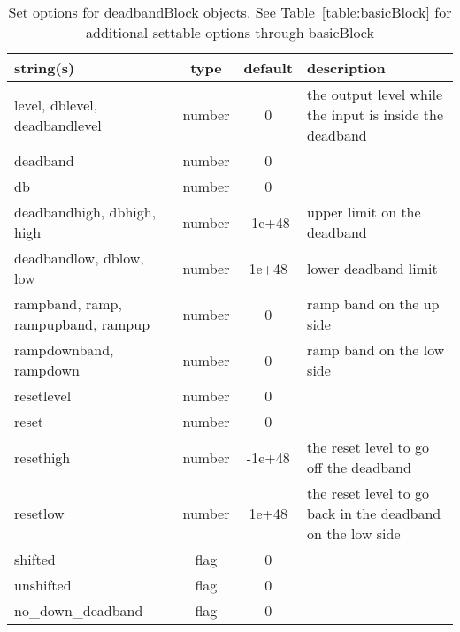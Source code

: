 \begin{table}[ht]
\centering
\begin{tabular}{p{5cm} c c p{7cm}}
\hline
string(s) & type & default & description \\
\hline
level, dblevel, deadbandlevel & number & 0 & the output level while the input is inside the deadband\\
deadband & number & 0 & \\
db & number & 0 & \\
deadbandhigh, dbhigh, high & number & -1e+48 & upper limit on the deadband\\
deadbandlow, dblow, low & number & 1e+48 & lower deadband limit\\
rampband, ramp, rampupband, rampup & number & 0 & ramp band on the up side\\
rampdownband, rampdown & number & 0 & ramp band on the low side\\
resetlevel & number & 0 & \\
reset & number & 0 & \\
resethigh & number & -1e+48 & the reset level to go off the deadband\\
resetlow & number & 1e+48 & the reset level to go back in the deadband on the low side\\
shifted & flag & 0 & \\
unshifted & flag & 0 & \\
no\_down\_deadband & flag & 0 & \\
\hline
\end{tabular}
\caption{Set options for deadbandBlock objects. See Table~\ref{table:basicBlock} for additional settable options through basicBlock}
\label{table:deadbandBlock}
\end{table}

